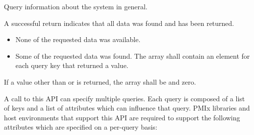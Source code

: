 \summary

Query information about the system in general.

\format


\begin{arglist}
\end{arglist}

A successful return indicates that all data was found and has been returned.

\returnstart
\begin{itemize}
\item {} None of the requested data was available.
\item {} Some of the requested data was found.
The  array shall contain an element for each query key that returned a value.
\end{itemize}
\returnend

If a value other than  or  is returned, the
 array shall be  and  zero.

\reqattrstart
A call to this \ac{API} can specify multiple queries.  Each query is composed of a list of keys and a list of attributes which can influence that query.  \ac{PMIx} libraries and host environments that support this \ac{API} are required to support the following attributes which are specified on a per-query basis:

